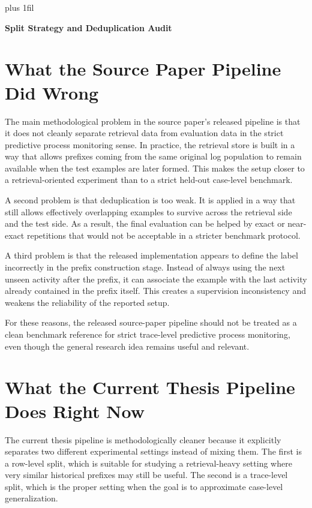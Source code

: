 \documentclass[version=last
        ,DIV=12
        ,BCOR=12mm
        ,twoside=false
        ,twocolumn=false
        ,open=any
        ,headinclude=false
        ,footinclude=false
        ,chapterprefix=true
        ,draft=false
        ,fontsize=11pt
        ,headings=big
        ,headsepline=true
        ,footsepline=false
        ,titlepage=false
        ,parskip=false
        ,captions=tableheading
]{scrbook}
\begin{document}
\justifying
\pagestyle{scrheadings}
\leftskip=0pt
\rightskip=0pt
\spaceskip=0pt
\xspaceskip=0pt
\parfillskip=0pt plus 1fil

\begin{center}
{\rmfamily\bfseries\fontsize{18}{22}\selectfont
Split Strategy and Deduplication Audit\par}
\end{center}
\vspace{0.8\baselineskip}

\section*{What the Source Paper Pipeline Did Wrong}
\noindent
The main methodological problem in the source paper's released pipeline is
that it does not cleanly separate retrieval data from evaluation data in the
strict predictive process monitoring sense. In practice, the retrieval store
is built in a way that allows prefixes coming from the same original log
population to remain available when the test examples are later formed. This
makes the setup closer to a retrieval-oriented experiment than to a strict
held-out case-level benchmark.

\indent A second problem is that deduplication is too weak. It is applied in a
way that still allows effectively overlapping examples to survive across the
retrieval side and the test side. As a result, the final evaluation can be
helped by exact or near-exact repetitions that would not be acceptable in a
stricter benchmark protocol.

\indent A third problem is that the released implementation appears to define
the label incorrectly in the prefix construction stage. Instead of always
using the next unseen activity after the prefix, it can associate the example
with the last activity already contained in the prefix itself. This creates a
supervision inconsistency and weakens the reliability of the reported setup.

\indent For these reasons, the released source-paper pipeline should not be
treated as a clean benchmark reference for strict trace-level predictive
process monitoring, even though the general research idea remains useful and
relevant.

\section*{What the Current Thesis Pipeline Does Right Now}
\noindent
The current thesis pipeline is methodologically cleaner because it explicitly
separates two different experimental settings instead of mixing them. The
first is a row-level split, which is suitable for studying a retrieval-heavy
setting where very similar historical prefixes may still be useful. The
second is a trace-level split, which is the proper setting when the goal is
to approximate case-level generalization.
\end{document}
